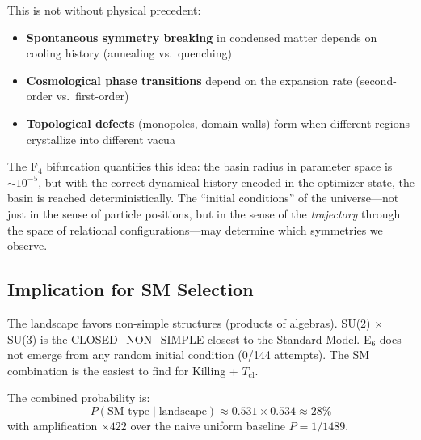 This is not without physical precedent:
\begin{itemize}
\item \textbf{Spontaneous symmetry breaking} in condensed matter depends on cooling history (annealing vs.\ quenching)
\item \textbf{Cosmological phase transitions} depend on the expansion rate (second-order vs.\ first-order)
\item \textbf{Topological defects} (monopoles, domain walls) form when different regions crystallize into different vacua
\end{itemize}

The F$_4$ bifurcation quantifies this idea: the basin radius in parameter space is $\sim 10^{-5}$, but with the correct dynamical history encoded in the optimizer state, the basin is reached deterministically. The ``initial conditions'' of the universe---not just in the sense of particle positions, but in the sense of the \textit{trajectory} through the space of relational configurations---may determine which symmetries we observe.

\subsection{Implication for SM Selection}\label{sec:sm_selection}

The landscape favors non-simple structures (products of algebras). SU(2) $\times$ SU(3) is the CLOSED\_NON\_SIMPLE closest to the Standard Model. E$_6$ does not emerge from any random initial condition (0/144 attempts). The SM combination is the easiest to find for Killing + $T_{\mathrm{cl}}$.

The combined probability is:
\begin{equation}
P(\text{SM-type} \mid \text{landscape}) \approx 0.531 \times 0.534 \approx 28\%
\end{equation}
with amplification \textbf{$\times 422$} over the naive uniform baseline $P = 1/1489$.
